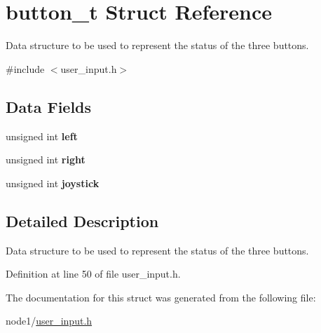 \hypertarget{structbutton__t}{}\section{button\+\_\+t Struct Reference}
\label{structbutton__t}


Data structure to be used to represent the status of the three buttons.  




{\ttfamily \#include $<$user\+\_\+input.\+h$>$}

\subsection*{Data Fields}
\begin{DoxyCompactItemize}
\item 
\mbox{\label{structbutton__t_a731354342f219205978856affa879ad1}} 
unsigned int {\bfseries left}
\item 
\mbox{\label{structbutton__t_a6bd980ba386f2479e8c46e55651a3f42}} 
unsigned int {\bfseries right}
\item 
\mbox{\label{structbutton__t_a7a196f36933a00c91aa1e680eb079c69}} 
unsigned int {\bfseries joystick}
\end{DoxyCompactItemize}


\subsection{Detailed Description}
Data structure to be used to represent the status of the three buttons. 

Definition at line 50 of file user\+\_\+input.\+h.



The documentation for this struct was generated from the following file\+:\begin{DoxyCompactItemize}
\item 
node1/\hyperlink{node1_2user__input_8h}{user\+\_\+input.\+h}\end{DoxyCompactItemize}
